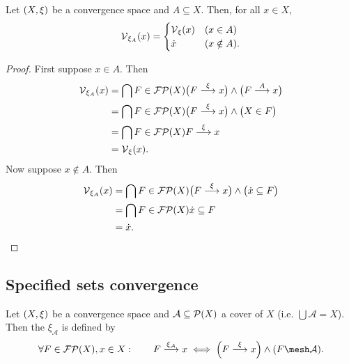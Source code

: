 \begin{lemma} \label{specifiedPointsModificationVicinity}
Let $\sSet{X,\xi}$ be a convergence space and $A\subseteq X$. Then, for all $x\in X$,
\[ \operatorname{\mathcal{V}}_{\xi_A}(x) = \begin{cases}
\operatorname{\mathcal{V}}_\xi(x) & (x\in A) \\
\dot{x} & (x\notin A).
\end{cases} \]
\end{lemma}
\begin{proof}
First suppose $x\in A$. Then
\begin{align*}
\operatorname{\mathcal{V}}_{\xi_A}(x) &= \bigcap{F\in\operatorname{\mathcal{FP}}(X)}{\big(F\overset{\xi}{\longrightarrow} x\big) \land \big(F\overset{A}{\longrightarrow} x\big)} \\
&= \bigcap{F\in\operatorname{\mathcal{FP}}(X)}{\big(F\overset{\xi}{\longrightarrow} x\big) \land \big(X\in F\big)} \\
&= \bigcap{F\in\operatorname{\mathcal{FP}}(X)}{F\overset{\xi}{\longrightarrow} x} \\
&= \operatorname{\mathcal{V}}_\xi(x).
\end{align*}
Now suppose $x\notin A$. Then
\begin{align*}
\operatorname{\mathcal{V}}_{\xi_A}(x) &= \bigcap{F\in\operatorname{\mathcal{FP}}(X)}{\big(F\overset{\xi}{\longrightarrow} x\big) \land \big(\dot{x} \subseteq F\big)} \\
&= \bigcap{F\in\operatorname{\mathcal{FP}}(X)}{\dot{x} \subseteq F} \\
&= \dot{x}.
\end{align*}
\end{proof}

\subsection{Specified sets convergence}
\begin{definition}
Let $\sSet{X,\xi}$ be a convergence space and $\mathcal{A}\subseteq \operatorname{\mathcal{P}}(X)$ a cover of $X$ (i.e. $\bigcup \mathcal{A} = X$). Then the  $\xi_{\mathcal{A}}$ is defined by
\[ \forall F\in\powerfilters(X), x\in X: \qquad F\overset{\xi_{\mathcal{A}}}{\longrightarrow} x \iff \Big(F \overset{\xi}{\longrightarrow} x\Big) \land (F \mesh \mathcal{A}). \]
\end{definition}

